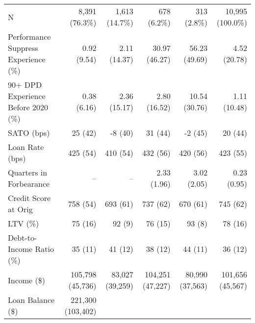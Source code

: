 \documentclass[11pt]{article}
\begin{document}
{\begin{table}[!h]
{\begin{tabular}{lccccc}
\multicolumn{1}{l}{N} &
  \multicolumn{1}{r}{8,391 (76.3\%)} &
  \multicolumn{1}{r}{1,613 (14.7\%)} &
  \multicolumn{1}{r}{678 (6.2\%)} &
  \multicolumn{1}{r}{313 (2.8\%)} &
  \multicolumn{1}{r}{10,995 (100.0\%)} \\
\multicolumn{1}{l}{Performance Suppress Experience (\%)} &
  \multicolumn{1}{r}{0.92 (9.54)} &
  \multicolumn{1}{r}{2.11 (14.37)} &
  \multicolumn{1}{r}{30.97 (46.27)} &
  \multicolumn{1}{r}{56.23 (49.69)} &
  \multicolumn{1}{r}{4.52 (20.78)} \\
\multicolumn{1}{l}{90+ DPD Experience Before 2020 (\%)} &
  \multicolumn{1}{r}{0.38 (6.16)} &
  \multicolumn{1}{r}{2.36 (15.17)} &
  \multicolumn{1}{r}{2.80 (16.52)} &
  \multicolumn{1}{r}{10.54 (30.76)} &
  \multicolumn{1}{r}{1.11 (10.48)} \\
\multicolumn{1}{l}{SATO (bps)} &
  \multicolumn{1}{r}{25 (42)} &
  \multicolumn{1}{r}{-8 (40)} &
  \multicolumn{1}{r}{31 (44)} &
  \multicolumn{1}{r}{-2 (45)} &
  \multicolumn{1}{r}{20 (44)} \\
\multicolumn{1}{l}{Loan Rate (bps)} &
  \multicolumn{1}{r}{425 (54)} &
  \multicolumn{1}{r}{410 (54)} &
  \multicolumn{1}{r}{432 (56)} &
  \multicolumn{1}{r}{420 (56)} &
  \multicolumn{1}{r}{423 (55)} \\
\multicolumn{1}{l}{Quarters in Forbearance} &
  \multicolumn{1}{r}{--} &
  \multicolumn{1}{r}{--} &
  \multicolumn{1}{r}{2.33 (1.96)} &
  \multicolumn{1}{r}{3.02 (2.05)} &
  \multicolumn{1}{r}{0.23 (0.95)} \\
\multicolumn{1}{l}{Credit Score at Orig} &
  \multicolumn{1}{r}{758 (54)} &
  \multicolumn{1}{r}{693 (61)} &
  \multicolumn{1}{r}{737 (62)} &
  \multicolumn{1}{r}{670 (61)} &
  \multicolumn{1}{r}{745 (62)} \\
\multicolumn{1}{l}{LTV (\%)} &
  \multicolumn{1}{r}{75 (16)} &
  \multicolumn{1}{r}{92 (9)} &
  \multicolumn{1}{r}{76 (15)} &
  \multicolumn{1}{r}{93 (8)} &
  \multicolumn{1}{r}{78 (16)} \\
\multicolumn{1}{l}{Debt-to-Income Ratio (\%)} &
  \multicolumn{1}{r}{35 (11)} &
  \multicolumn{1}{r}{41 (12)} &
  \multicolumn{1}{r}{38 (12)} &
  \multicolumn{1}{r}{44 (11)} &
  \multicolumn{1}{r}{36 (12)} \\
\multicolumn{1}{l}{Income (\$)} &
  \multicolumn{1}{r}{105,798 (45,736)} &
  \multicolumn{1}{r}{83,027 (39,259)} &
  \multicolumn{1}{r}{104,251 (47,227)} &
  \multicolumn{1}{r}{80,990 (37,563)} &
  \multicolumn{1}{r}{101,656 (45,567)} \\
\multicolumn{1}{l}{Loan Balance (\$)} &
  \multicolumn{1}{r}{221,300 (103,402)} &

\end{tabular}}
\end{table}}
\end{document}
